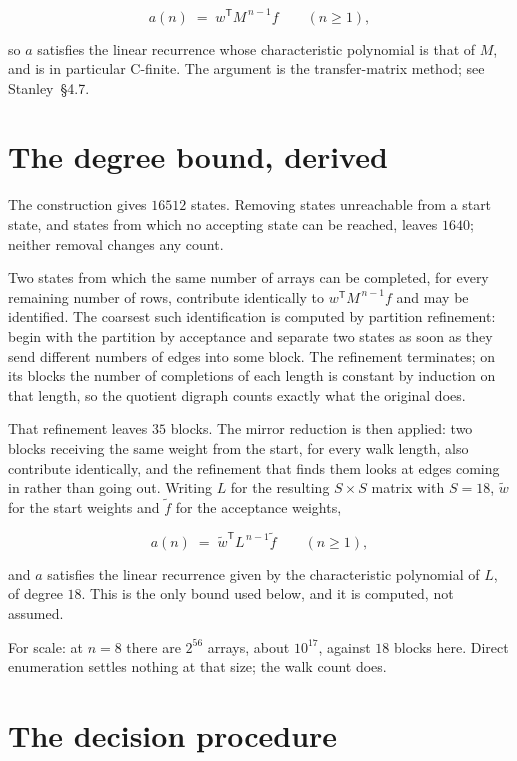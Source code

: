 \documentclass[11pt]{article}
\theoremstyle{definition}
\begin{document}
\[a(n) \;=\; w^{\mathsf T} M^{\,n-1} f \qquad (n \ge 1),\]

so $a$ satisfies the linear recurrence whose characteristic polynomial is that of $M$, and is in particular C-finite. The argument is the transfer-matrix method; see Stanley~\S4.7.

\section{The degree bound, derived}

The construction gives $16512$ states. Removing states unreachable from a start state, and states from which no accepting state can be reached, leaves $1640$; neither removal changes any count.

Two states from which the same number of arrays can be completed, for every remaining number of rows, contribute identically to $w^{\mathsf T}M^{\,n-1}f$ and may be identified. The coarsest such identification is computed by partition refinement: begin with the partition by acceptance and separate two states as soon as they send different numbers of edges into some block. The refinement terminates; on its blocks the number of completions of each length is constant by induction on that length, so the quotient digraph counts exactly what the original does.

That refinement leaves $35$ blocks. The mirror reduction is then applied: two blocks receiving the same weight from the start, for every walk length, also contribute identically, and the refinement that finds them looks at edges coming in rather than going out. Writing $L$ for the resulting $S \times S$ matrix with $S = 18$, $\tilde w$ for the start weights and $\tilde f$ for the acceptance weights,

\[a(n) \;=\; \tilde w^{\mathsf T} L^{\,n-1} \tilde f \qquad (n \ge 1),\]

and $a$ satisfies the linear recurrence given by the characteristic polynomial of $L$, of degree $18$. This is the only bound used below, and it is computed, not assumed.

For scale: at $n = 8$ there are $2^{56}$ arrays, about $10^{17}$, against $18$ blocks here. Direct enumeration settles nothing at that size; the walk count does.

\section{The decision procedure}
\end{document}
